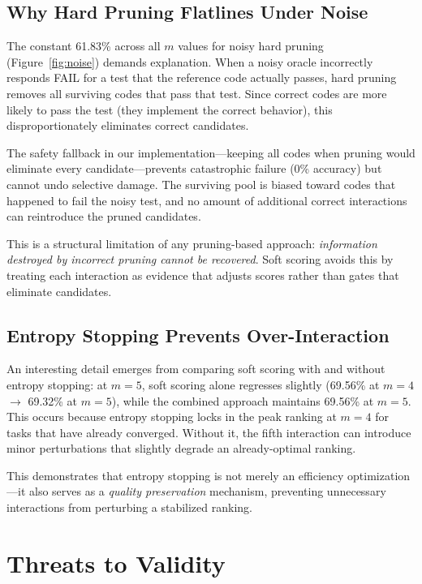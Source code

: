\documentclass[conference]{IEEEtran}
\begin{document}
\subsection{Why Hard Pruning Flatlines Under Noise}

The constant 61.83\% across all $m$ values for noisy hard pruning (Figure~\ref{fig:noise}) demands explanation. When a noisy oracle incorrectly responds FAIL for a test that the reference code actually passes, hard pruning removes all surviving codes that pass that test. Since correct codes are more likely to pass the test (they implement the correct behavior), this disproportionately eliminates correct candidates.

The safety fallback in our implementation---keeping all codes when pruning would eliminate every candidate---prevents catastrophic failure (0\% accuracy) but cannot undo selective damage. The surviving pool is biased toward codes that happened to fail the noisy test, and no amount of additional correct interactions can reintroduce the pruned candidates.

This is a structural limitation of any pruning-based approach: \emph{information destroyed by incorrect pruning cannot be recovered}. Soft scoring avoids this by treating each interaction as evidence that adjusts scores rather than gates that eliminate candidates.

\subsection{Entropy Stopping Prevents Over-Interaction}

An interesting detail emerges from comparing soft scoring with and without entropy stopping: at $m=5$, soft scoring alone regresses slightly (69.56\% at $m=4$ $\to$ 69.32\% at $m=5$), while the combined approach maintains 69.56\% at $m=5$. This occurs because entropy stopping locks in the peak ranking at $m=4$ for tasks that have already converged. Without it, the fifth interaction can introduce minor perturbations that slightly degrade an already-optimal ranking.

This demonstrates that entropy stopping is not merely an efficiency optimization---it also serves as a \emph{quality preservation} mechanism, preventing unnecessary interactions from perturbing a stabilized ranking.

\section{Threats to Validity}
\end{document}
